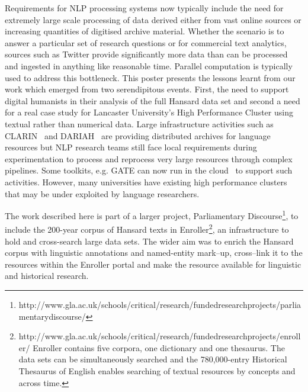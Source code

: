 Requirements for NLP processing systems now typically include the need for extremely large scale processing of data derived either from vast online sources or increasing quantities of digitised archive material. 
Whether the scenario is to answer a particular set of research questions or for commercial text analytics, sources such as Twitter provide significantly more data than can be processed and ingested in anything like reasonable time. Parallel computation is typically used to address this bottleneck. 
This poster presents the lessons learnt from our work which emerged from two serendipitous events. First, the need to support digital humanists in their analysis of the full Hansard data set and second a need for a real case study for Lancaster University's High Performance Cluster using textual rather than numerical data. Large infrastructure activities such as CLARIN~\cite{varadi2008clarin} and DARIAH~\cite{constantopoulos2008preparing} are providing distributed archives for language resources but NLP research teams still face local requirements during experimentation to process and reprocess very large resources through complex pipelines. Some toolkits, e.g. GATE can now run in the cloud~\cite{tablan2013gatecloud} to support such activities. However, many universities have existing high performance clusters that may be under exploited by language researchers.  

The work described here is part of a larger project, Parliamentary Discourse\footnote{http://www.gla.ac.uk/schools/critical/research/fundedresearchprojects/parliamentarydiscourse/}, to include the 200-year corpus of Hansard texts in Enroller\footnote{http://www.gla.ac.uk/schools/critical/research/fundedresearchprojects/enroller/ Enroller contains five corpora, one dictionary and one thesaurus. The data sets can be simultaneously searched and the 780,000-entry Historical Thesaurus of English enables searching of textual resources by concepts and across time.}, an infrastructure to hold and cross-search large data sets. The wider aim was to enrich the Hansard corpus with linguistic annotations and named-entity mark--up, cross--link it to the resources within the Enroller portal and make the resource available for linguistic and historical research. 

